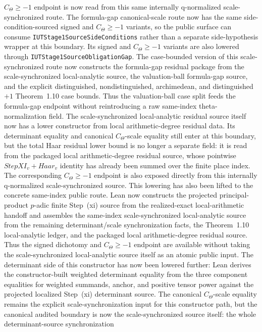\documentclass[11pt]{article}
\theoremstyle{plain}
\theoremstyle{definition}
\theoremstyle{remark}
\begin{document}
\(C_\Theta\geq -1\) endpoint is now read from this same internally
q-normalized scale-synchronized route.  The formula-gap canonical-scale route
now has the same side-condition-sourced signed and \(C_\Theta\geq -1\)
variants, so the public surface can consume
\texttt{IUTStage1SourceSideConditions} rather than a separate
side-hypothesis wrapper at this boundary.  Its signed and \(C_\Theta\geq -1\)
variants are also lowered through \texttt{IUTStage1SourceObligationGap}.
The case-bounded version of this scale-synchronized route now constructs the
formula-gap residual package from the scale-synchronized local-analytic source,
the valuation-ball formula-gap source, and the explicit distinguished,
nondistinguished, archimedean, and distinguished \(+1\) Theorem~1.10 case
bounds.  Thus the valuation-ball case split feeds the formula-gap endpoint
without reintroducing a raw same-index theta-normalization field.
The scale-synchronized local-analytic residual source itself now has a lower
constructor from local arithmetic-degree residual data.  Its determinant
equality and canonical \(C_\Theta\)-scale equality still enter at this boundary,
but the total Haar residual lower bound is no longer a separate field: it is
read from the packaged local arithmetic-degree residual source, whose
pointwise \(StepXI_v+Haar_v\) identity has already been summed over the finite
place index.  The corresponding \(C_\Theta\geq -1\) endpoint is also exposed
directly from this internally q-normalized scale-synchronized source.
This lowering has also been lifted to the concrete same-index public route.
Lean now constructs the projected principal-product \(p\)-adic finite
Step~(xi) source from the realized-exact local-arithmetic handoff and assembles
the same-index scale-synchronized local-analytic source from the remaining
determinant/scale synchronization facts, the Theorem~1.10 local-analytic
ledger, and the packaged local arithmetic-degree residual source.  Thus the
signed dichotomy and \(C_\Theta\geq -1\) endpoint are available without taking
the scale-synchronized local-analytic source itself as an atomic public input.
The determinant side of this constructor has now been lowered further: Lean
derives the constructor-built weighted determinant equality from the three
component equalities for weighted summands, anchor, and positive tensor power
against the projected localized Step~(xi) determinant source.  The canonical
\(C_\Theta\)-scale equality remains the explicit scale-synchronization input
for this constructor path, but the canonical audited boundary is now the
scale-synchronized source itself: the whole determinant-source synchronization
\end{document}
